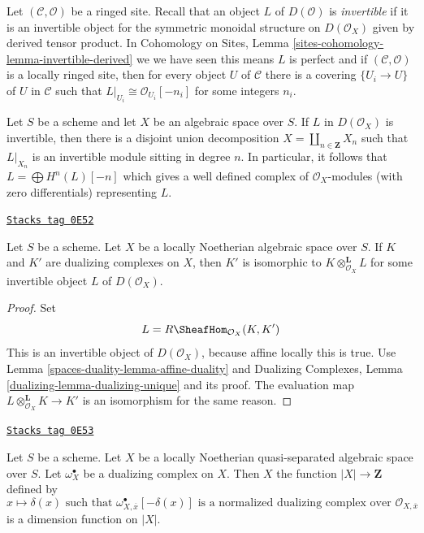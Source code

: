 Let $(\mathcal{C}, \mathcal{O})$ be a ringed site. Recall
that an object $L$ of $D(\mathcal{O})$ is {\it invertible}
if it is an invertible object for the symmetric monoidal
structure on $D(\mathcal{O}_X)$ given by derived tensor product. In
Cohomology on Sites, Lemma \ref{sites-cohomology-lemma-invertible-derived}
we we have seen this means $L$ is perfect and if $(\mathcal{C}, \mathcal{O})$
is a locally ringed site, then for every object $U$ of $\mathcal{C}$
there is a covering $\{U_i \to U\}$ of $U$ in $\mathcal{C}$
such that $L|_{U_i} \cong \mathcal{O}_{U_i}[-n_i]$
for some integers $n_i$.

\medskip\noindent
Let $S$ be a scheme and let $X$ be an algebraic space over $S$.
If $L$ in $D(\mathcal{O}_X)$ is invertible, then there is a
disjoint union decomposition $X = \coprod_{n \in \mathbf{Z}} X_n$
such that $L|_{X_n}$ is an invertible module sitting in degree $n$.
In particular, it follows that $L = \bigoplus H^n(L)[-n]$
which gives a well defined complex of $\mathcal{O}_X$-modules
(with zero differentials) representing $L$.

\begin{lemma}
\label{spaces-duality-lemma-dualizing-unique-spaces}
\href{https://stacks.math.columbia.edu/tag/0E52}{\texttt{Stacks tag 0E52}}

Let $S$ be a scheme.
Let $X$ be a locally Noetherian algebraic space over $S$.
If $K$ and $K'$ are dualizing complexes on $X$, then $K'$
is isomorphic to $K \otimes_{\mathcal{O}_X}^\mathbf{L} L$
for some invertible object $L$ of $D(\mathcal{O}_X)$.
\end{lemma}

\begin{proof}
Set
$$
L = R\SheafHom_{\mathcal{O}_X}(K, K')
$$
This is an invertible object of $D(\mathcal{O}_X)$, because affine locally
this is true. Use Lemma \ref{spaces-duality-lemma-affine-duality} and
Dualizing Complexes, Lemma
\ref{dualizing-lemma-dualizing-unique} and its proof.
The evaluation map $L \otimes_{\mathcal{O}_X}^\mathbf{L} K \to K'$
is an isomorphism for the same reason.
\end{proof}

\begin{lemma}
\label{spaces-duality-lemma-dimension-function-scheme}
\href{https://stacks.math.columbia.edu/tag/0E53}{\texttt{Stacks tag 0E53}}

Let $S$ be a scheme. Let $X$ be a locally Noetherian
quasi-separated algebraic space over $S$.
Let $\omega_X^\bullet$ be a dualizing complex on $X$. Then $X$ the function
$|X| \to \mathbf{Z}$ defined by
$$
x \longmapsto \delta(x)\text{ such that }
\omega_{X, \overline{x}}^\bullet[-\delta(x)]
\text{ is a normalized dualizing complex over }
\mathcal{O}_{X, \overline{x}}
$$
is a dimension function on $|X|$.
\end{lemma}

